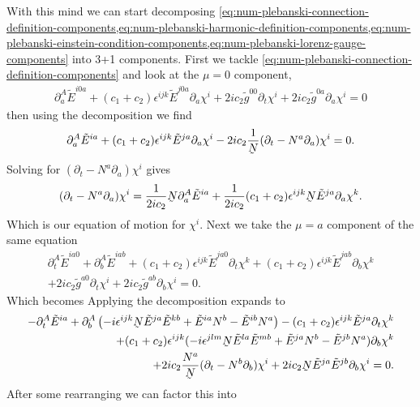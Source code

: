 \documentclass[10pt]{report}
\newcommand{\utilde}[1]{\underaccent{\tilde}{#1}}
\theoremstyle{definition}
\newcommand{\tE}[0]{\tilde{E}}
\newcommand{\tg}[0]{\tilde{g}}
\newcommand{\dlap}[0]{\utilde{N}}
\begin{document}
    With this mind we can start decomposing \cref{eq:num-plebanski-connection-definition-components,eq:num-plebanski-harmonic-definition-components,eq:num-plebanski-einstein-condition-components,eq:num-plebanski-lorenz-gauge-components} into 3+1 components. 
    First we tackle \cref{eq:num-plebanski-connection-definition-components} and look at the $\mu =0$ component,
    \begin{align}
        \partial_a^A \tE^{i0a} + (c_1 + c_2) \epsilon^{ijk} \tE^{j0a} \partial_a \chi^i + 2i c_2 \tg^{00} \partial_t \chi^i + 2ic_2 \tg^{0a} \partial_a \chi^i = 0
    \end{align}
    then using the decomposition we find
    \begin{align}
        \partial_a^A \tE^{ia} + (c_1 + c_2) \epsilon^{ijk} \tE^{ja} \partial_a \chi^i - 2ic_2\frac{1}{\dlap} ( \partial_t - N^a \partial_a) \chi^i = 0.
    \end{align}
    Solving for $(\partial_t - N^a \partial_a) \chi^i$ gives
    \begin{align}
        (\partial_t - N^a \partial_a) \chi^i = \frac{1}{2 i c_2} \dlap \partial^A_a \tE^{ia} + \frac{1}{2 i c_2} (c_1 + c_2) \epsilon^{ijk} \dlap \tE^{ja} \partial_a \chi^k.
    \end{align}
    Which is our equation of motion for $\chi^i$. Next we take the $\mu = a$ component of the same equation 
    \begin{align}
        \partial_t^A \tE^{ia0} + \partial_b^A \tE^{iab} + (c_1 + c_2) \epsilon^{ijk} \tE^{ja0} \partial_t \chi^k + (c_1 + c_2) \epsilon^{ijk} \tE^{jab} \partial_b \chi^k \nonumber \\ + 2i c_2 \tg^{a0} \partial_t \chi^i + 2i c_2 \tg^{ab} \partial_b \chi^i = 0.
    \end{align}
    Which becomes 
    Applying the decomposition expands to 
    \begin{align}
        - \partial_t^A \tE^{ia} + \partial^A_b \left( -i \epsilon^{ijk} \dlap \tE^{ja} \tE^{kb} + \tE^{ia} N^b - \tE^{ib} N^a \right) - (c_1 + c_2) \epsilon^{ijk} \tE^{ja} \partial_t \chi^k  \nonumber\\ + (c_1 + c_2) \epsilon^{ijk} (-i \epsilon^{jlm} \dlap \tE^{la} \tE^{mb} + \tE^{ja} N^b - \tE^{jb} N^a) \partial_b \chi^k \nonumber \\ + 2i c_2 \frac{N^a}{\dlap} (\partial_t - N^b \partial_b) \chi^i + 2ic_2 \dlap \tE^{ja} \tE^{jb} \partial_b \chi^i = 0.
    \end{align}
    After some rearranging we can factor this into 
\end{document}
